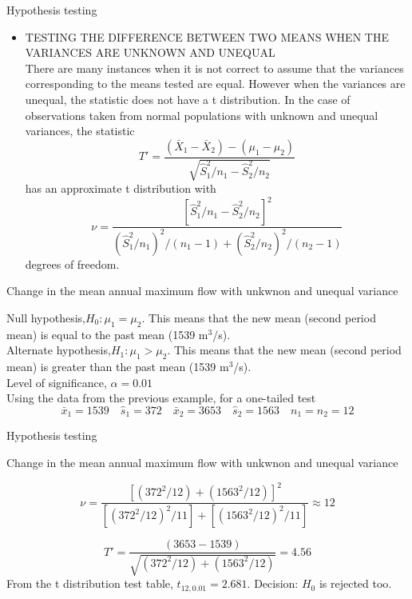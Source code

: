\documentclass[8pt]{beamer}
\renewcommand{\emph}[1]{\textcolor{myorange}{#1}}
\begin{document}
\begin{frame}{Hypothesis testing}
   \begin{itemize}
        \item \alert{TESTING THE DIFFERENCE BETWEEN TWO MEANS WHEN THE VARIANCES ARE UNKNOWN AND UNEQUAL}\\
            There are many instances when it is not correct to assume that the variances corresponding to the means tested are equal. However when the variances are unequal, the statistic does not have a \emph{t distribution}. In the case of observations taken from normal populations with unknown and unequal variances, the statistic
\[
    T' = \frac{(\bar{X}_1 - \bar{X}_2) - (\mu_1 - \mu_2)}{\sqrt{\hat{S}_1^2 /n_1 - \hat{S}_2^2 /n_2}} 
\]
has an approximate \emph{t distribution} with
\[
    \nu = \frac{\left[ \hat{S}_1^2 /n_1 - \hat{S}_2^2 /n_2 \right]^2}{ (\hat{S}_1^2 /n_1)^2 / (n_1-1) + (\hat{S}_2^2 /n_2)^2 /(n_2 -1) }
\]
degrees of freedom.
    \end{itemize}

    \begin{exampleblock}{Change in  the mean annual maximum flow with unkwnon and unequal variance}

    \emph{Null hypothesis},$H_0 : \mu_1 = \mu_2$. This means that the new mean (second period mean) is equal to the past mean (1539 m$^3$/s).\\
    \emph{Alternate hypothesis},$H_1 : \mu_1 > \mu_2$. This means that the new mean (second period mean) is greater than the past mean (1539 m$^3$/s).\\
    \emph{Level of significance}, $\alpha = 0.01$ \\
    Using the data from the previous example, for a one-tailed test
\[
    \bar{x}_1 = 1539 \quad \hat{s}_1 = 372 \quad \bar{x}_2 = 3653 \quad \hat{s}_2 = 1563 \quad n_1 = n_2 = 12
\]

    \end{exampleblock}
\end{frame}

\begin{frame}{Hypothesis testing}
    \begin{exampleblock}{Change in  the mean annual maximum flow with unkwnon and unequal variance}

        \[
            \nu = \frac{\left[(372^2 / 12) + (1563^2 / 12) \right]^2}{ \left[(372^2 / 12)^2 /11\right] +  \left[(1563^2 / 12)^2 /11\right]} \approx  12
        \]

        \[
            T' = \frac{(3653-1539)}{\sqrt{(372^2 / 12) + (1563^2 / 12)}} = 4.56
        \]
        From the \emph{t distribution} test table, $t_{12, 0.01} = 2.681$. \emph{Decision: $H_0$ is rejected too}.

    \end{exampleblock}
\end{frame}
\end{document}

